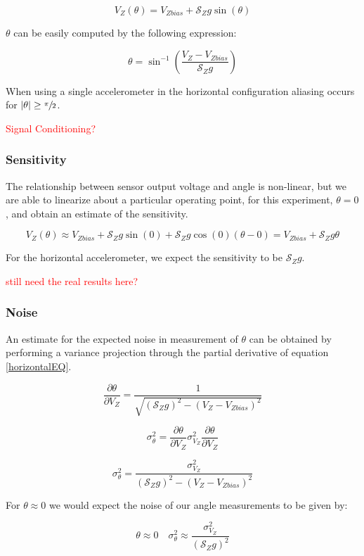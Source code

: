 \documentclass{article}
\newcommand{\xxx}[1]{\textcolor{red}{#1}}
\theoremstyle{plain}
\theoremstyle{definition}
\theoremstyle{remark}
\newcommand{\Sens}{\mathcal{S}}
\begin{document}
$$ V_{Z}(\theta) = V_{Zbias} + \Sens_{Z} g \sin(\theta) $$

$\theta$ can be easily computed by the following expression:

\begin{equation}
\theta = \sin^{-1}\left( \frac{V_{Z} - V_{Zbias}}{\Sens_{Z} g}\right) 
\label{horizontalEQ}
\end{equation}

When using a single accelerometer in the horizontal configuration aliasing occurs for $|\theta| \geq \sfrac{\pi}{2}$.

\xxx{Signal Conditioning?}

\subsubsection{Sensitivity}

The relationship between sensor output voltage and angle is non-linear, but we are able to linearize about a particular operating point, for this experiment, $\theta = 0$, and obtain an estimate of the sensitivity.

$$ V_{Z}(\theta) \approx V_{Zbias} + \Sens_{Z} g \sin(0) + \Sens_{Z} g \cos(0) \left(\theta - 0\right) = V_{Zbias} + \Sens_{Z} g \theta $$

For the horizontal accelerometer, we expect the sensitivity to be $\Sens_{Z} g$. 

\xxx{still need the real results here?}

\subsubsection{Noise}

An estimate for the expected noise in measurement of $\theta$ can be obtained by performing a variance projection through the partial derivative of equation \ref{horizontalEQ}.

$$ \frac{\partial \theta}{\partial V_{Z}} =  \frac{1}{\sqrt{(\Sens_{Z} g)^2 - (V_{Z} - V_{Zbias})^2}}$$

$$ \sigma^2_{\theta} = \frac{\partial \theta}{\partial V_{Z}} \sigma^2_{V_{Z}} \frac{\partial \theta}{\partial V_{Z}} $$

$$ \sigma^2_{\theta} = \frac{\sigma^2_{V_{Z}}}{(\Sens_{Z} g)^2 - (V_{Z} - V_{Zbias})^2}$$

For $\theta \approx 0$ we would expect the noise of our angle measurements to be given by:

$$ \theta \approx 0 \quad \sigma^2_{\theta} \approx \frac{\sigma^2_{V_{Z}}}{(\Sens_{Z} g)^2}$$
\end{document}
